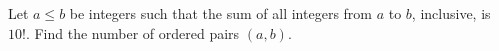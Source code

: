Let $a\le b$ be integers such that the sum of all integers from $a$ to $b$, inclusive, is $10!$. Find the number of ordered pairs $(a,b)$.
